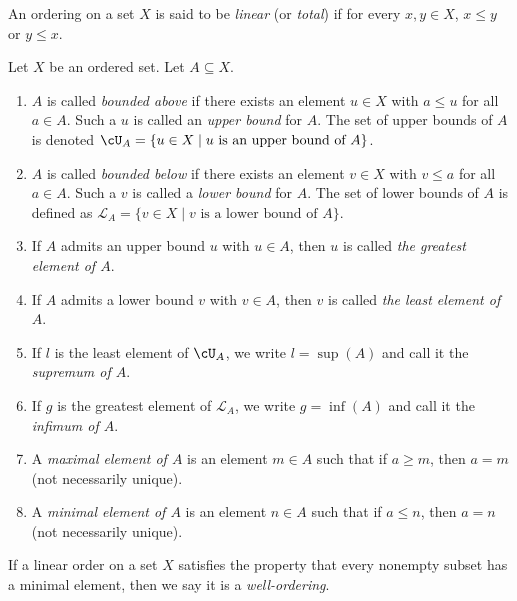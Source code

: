     \begin{definition}
        An ordering on a set $X$ is said to be \textit{linear} (or \textit{total}) if for every $x,y \in X$, $x \leq y$ or $y \leq x$.
    \end{definition}

    \begin{definition}
        Let $X$ be an ordered set. Let $A \subseteq X$.
        \begin{enumerate}[label = (\arabic*),itemsep=1pt,topsep=3pt]
            \item $A$ is called \textit{bounded above} if there exists an element $u \in X$ with $a \leq u$ for all $a \in A$. Such a $u$ is called an \textit{upper bound} for $A$. The set of upper bounds of $A$ is denoted $\cU_A = \{u \in X \mid \text{$u$ is an upper bound of $A$}\}$.
            \item $A$ is called \textit{bounded below} if there exists an element $v \in X$ with $v \leq a$ for all $a \in A$. Such a $v$ is called a \textit{lower bound} for $A$. The set of lower bounds of $A$ is defined as $\mathscr{L}_A = \{v \in X \mid \text{$v$ is a lower bound of $A$}\}$.
            \item If $A$ admits an upper bound $u$ with $u \in A$, then $u$ is called \textit{the greatest element of $A$}.
            \item If $A$ admits a lower bound $v$ with $v \in A$, then $v$ is called \textit{the least element of $A$}.
            \item If $l$ is the least element of $\cU_A$, we write $l = \sup{(A)}$ and call it the \textit{supremum of $A$}.
            \item If $g$ is the greatest element of $\mathscr{L}_A$, we write $g = \inf{(A)}$ and call it the \textit{infimum of $A$}.
            \item A \textit{maximal element of $A$} is an element $m \in A$ such that if $a \geq m$, then $a = m$ (not necessarily unique).
            \item A \textit{minimal element of $A$} is an element $n \in A$ such that if $a \leq n$, then $a = n$ (not necessarily unique).
        \end{enumerate}
    \end{definition}

    \begin{definition}
        If a linear order on a set $X$ satisfies the property that every nonempty subset has a minimal element, then we say it is a \textit{well-ordering}.
    \end{definition}

